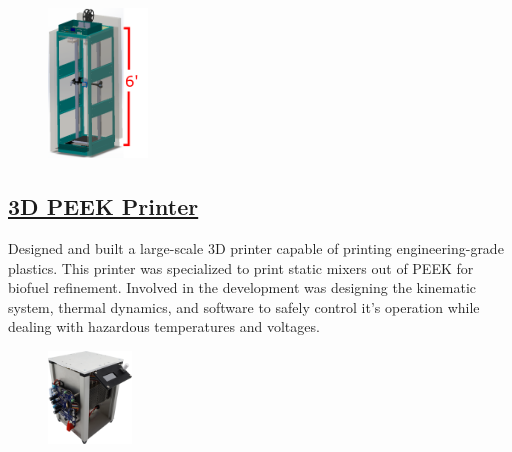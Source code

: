 \documentclass[
	10pt, %
]{FreemanCV}
\begin{document}
\begin{paracol}{2}

\setlength\intextsep{7pt} %
\begin{figure} %
	\hspace*{-23pt} %
    \includegraphics[width=75pt]{printer} %
\end{figure}

\vspace*{-10pt} %
\leavevmode\subsection{\href{https://github.com/jfcbooth/3dpp}{3D PEEK Printer \scriptsize\faLink}}

Designed and built a large-scale 3D printer capable of printing engineering-grade plastics.
This printer was specialized to print static mixers out of PEEK for biofuel refinement.
Involved in the development was designing the kinematic system, thermal dynamics, and software to safely control it's operation
while dealing with hazardous temperatures and voltages.


\setlength\intextsep{20pt} %
\begin{figure} %
    \includegraphics[width=63pt]{cold_plate} %
\end{figure}


\end{paracol}
\end{document}
